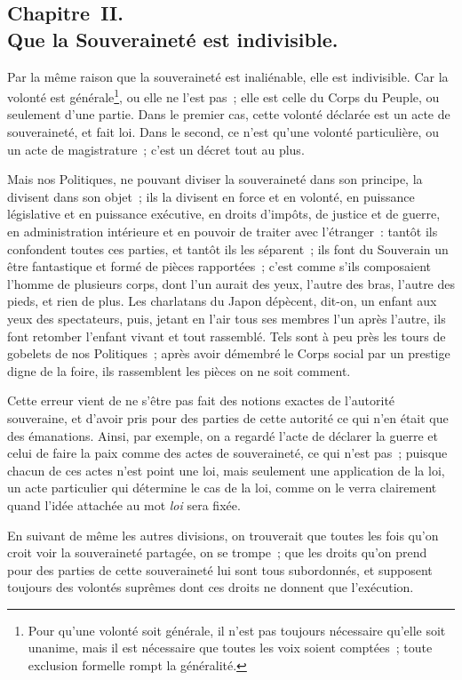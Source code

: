 \documentclass[french,twoside]{book} %
\begin{document}
\subsection[{Chapitre II. Que la Souveraineté est indivisible.}]{Chapitre II. \\
Que la Souveraineté est indivisible.}
\noindent Par la même raison que la souveraineté est inaliénable, elle est indivisible. Car la volonté est générale\footnote{Pour qu’une volonté soit générale, il n’est pas toujours nécessaire qu’elle soit unanime, mais il est nécessaire que toutes les voix soient comptées ; toute exclusion formelle rompt la généralité.}, ou elle ne l’est pas ; elle est celle du Corps du Peuple, ou seulement d’une partie. Dans le premier cas, cette volonté déclarée est un acte de souveraineté, et fait loi. Dans le second, ce n’est qu’une volonté particulière, ou un acte de magistrature ; c’est un décret tout au plus.\par
Mais nos Politiques, ne pouvant diviser la souveraineté dans son principe, la divisent dans son objet ; ils la divisent en force et en volonté, en puissance législative et en puissance exécutive, en droits d’impôts, de justice et de guerre, en administration intérieure et en pouvoir de traiter avec l’étranger : tantôt ils confondent toutes ces parties, et tantôt ils les séparent ; ils font du Souverain un être fantastique et formé de pièces rapportées ; c’est comme s’ils composaient l’homme de plusieurs corps, dont l’un aurait des yeux, l’autre des bras, l’autre des pieds, et rien de plus. Les charlatans du Japon dépècent, dit-on, un enfant aux yeux des spectateurs, puis, jetant en l’air tous ses membres l’un après l’autre, ils font retomber l’enfant vivant et tout rassemblé. Tels sont à peu près les tours de gobelets de nos Politiques ; après avoir démembré le Corps social par un prestige digne de la foire, ils rassemblent les pièces on ne soit comment.\par
Cette erreur vient de ne s’être pas fait des notions exactes de l’autorité souveraine, et d’avoir pris pour des parties de cette autorité ce qui n’en était que des émanations. Ainsi, par exemple, on a regardé l’acte de déclarer la guerre et celui de faire la paix comme des actes de souveraineté, ce qui n’est pas ; puisque chacun de ces actes n’est point une loi, mais seulement une application de la loi, un acte particulier qui détermine le cas de la loi, comme on le verra clairement quand l’idée attachée au mot {\itshape loi} sera fixée.\par
En suivant de même les autres divisions, on trouverait que toutes les fois qu’on croit voir la souveraineté partagée, on se trompe ; que les droits qu’on prend pour des parties de cette souveraineté lui sont tous subordonnés, et supposent toujours des volontés suprêmes dont ces droits ne donnent que l’exécution.\par
\end{document}
